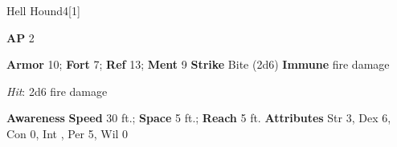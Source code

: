 \begin{monsection}{Hell Hound}{4}[1]
\vspace{-1em}\vspace{-1em}
\begin{spellcontent}
\begin{spelltargetinginfo}
{\textbf{AP} 2}

\pari \textbf{Armor} 10;
\textbf{Fort} 7;
\textbf{Ref} 13;
\textbf{Ment} 9
\pari \textbf{Strike} Bite  (2d6)
\pari \textbf{Immune} fire damage


\end{spelltargetinginfo}


\begin{spelleffects}

\pari

\par


\par \textit{Hit}: 2d6 fire damage


\end{spelleffects}

\end{spellcontent}

\begin{monsterfooter}
\pari \textbf{Awareness} 
\pari \textbf{Speed} 30 ft.;
\textbf{Space} 5 ft.;
\textbf{Reach} 5 ft.
\pari \textbf{Attributes}
Str 3,
Dex 6,
Con 0,
Int ,
Per 5,
Wil 0
\end{monsterfooter}
\end{monsection}



